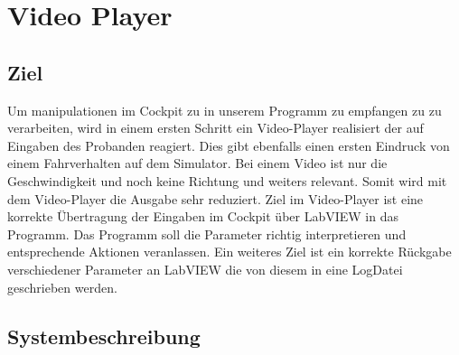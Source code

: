 \section{Video Player}
\subsection{Ziel}
Um manipulationen im Cockpit zu in unserem Programm zu empfangen zu zu verarbeiten, wird in einem ersten Schritt ein Video-Player realisiert der auf Eingaben des Probanden reagiert. Dies gibt ebenfalls einen ersten Eindruck von einem Fahrverhalten auf dem Simulator. Bei einem Video ist nur die Geschwindigkeit und noch keine Richtung und weiters relevant. Somit wird mit dem Video-Player die Ausgabe sehr reduziert. Ziel im Video-Player ist eine korrekte Übertragung der Eingaben im Cockpit über LabVIEW in das Programm. Das Programm soll die Parameter richtig interpretieren und entsprechende Aktionen veranlassen. Ein weiteres Ziel ist ein korrekte Rückgabe verschiedener Parameter an LabVIEW die von diesem in eine LogDatei geschrieben werden. 
\subsection{Systembeschreibung}

